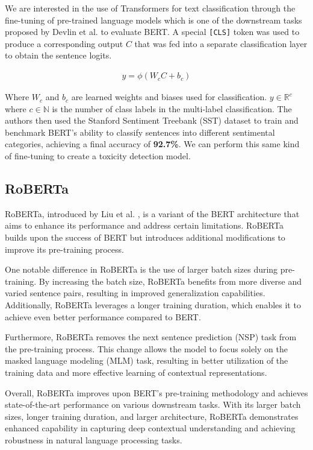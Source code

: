 We are interested in the use of Transformers for text classification through the fine-tuning of pre-trained language models which is one of the downstream tasks proposed by Devlin et al. to evaluate BERT. A special \verb|[CLS]| token was used to produce a corresponding output $C$ that was fed into a separate classification layer to obtain the sentence logits.

\begin{equation}
    \begin{gathered}
        y = \phi\left( W_{c}C+b_{c} \right)
    \end{gathered}
    \label{eq:bert_classification}
\end{equation}

Where $W_{c}$ and $b_{c}$ are learned weights and biases used for classification. $y \in \mathbb{R}^c$ where $c \in \mathbb{N}$ is the number of class labels in the multi-label classification. The authors then used the Stanford Sentiment Treebank (SST) dataset to train and benchmark BERT's ability to classify sentences into different sentimental categories, achieving a final accuracy of \textbf{92.7\%}. We can perform this same kind of fine-tuning to create a toxicity detection model.

\subsection{RoBERTa}

RoBERTa, introduced by Liu et al. \cite{RoBERTa}, is a variant of the BERT architecture that aims to enhance its performance and address certain limitations. RoBERTa builds upon the success of BERT but introduces additional modifications to improve its pre-training process.

One notable difference in RoBERTa is the use of larger batch sizes during pre-training. By increasing the batch size, RoBERTa benefits from more diverse and varied sentence pairs, resulting in improved generalization capabilities. Additionally, RoBERTa leverages a longer training duration, which enables it to achieve even better performance compared to BERT.

Furthermore, RoBERTa removes the next sentence prediction (NSP) task from the pre-training process. This change allows the model to focus solely on the masked language modeling (MLM) task, resulting in better utilization of the training data and more effective learning of contextual representations.

Overall, RoBERTa improves upon BERT's pre-training methodology and achieves state-of-the-art performance on various downstream tasks. With its larger batch sizes, longer training duration, and larger architecture, RoBERTa demonstrates enhanced capability in capturing deep contextual understanding and achieving robustness in natural language processing tasks.

